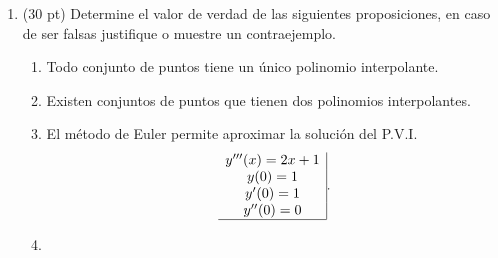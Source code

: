 \documentclass[11pt]{article}
\begin{document}
\begin{enumerate}
\item (30 pt) Determine el valor de verdad de las siguientes proposiciones, en caso de ser falsas justifique o muestre un contraejemplo.
\begin{enumerate}
\item
\fbox{ \begin{minipage}{1cm}   \hfill\vspace{1cm}   		
    \end{minipage} } 
    \begin{minipage}{0.4\textwidth}
	Todo conjunto de puntos tiene un \'unico polinomio interpolante.
    \end{minipage} 
    \begin{minipage}{0.4\textwidth}
    \end{minipage}
%
\item
\fbox{ \begin{minipage}{1cm}   \hfill\vspace{1cm}   		
    \end{minipage} } 
    \begin{minipage}{0.4\textwidth}
	Existen conjuntos de puntos que tienen dos polinomios interpolantes.
    \end{minipage} 
    \begin{minipage}{0.4\textwidth}
    \end{minipage}
%
\item
\fbox{ \begin{minipage}{1cm}    \hfill\vspace{1cm}   		
    \end{minipage} } 
    \begin{minipage}{0.4\textwidth}
	El método de Euler permite aproximar la soluci\'on del P.V.I. 
    $$
    \begin{array}{c|}
    y'''(x)=2x+1\\
    y(0)=1  \\
    y'(0)=1 \\
    y''(0)=0\\ \hline
    \end{array}.
    $$
    \end{minipage} 
    \begin{minipage}{0.4\textwidth}
    \end{minipage}
%
\item
\fbox{ \begin{minipage}{1cm}  \hfill\vspace{1cm}   		
    \end{minipage} } 

\end{enumerate}
\end{enumerate}
\end{document}
